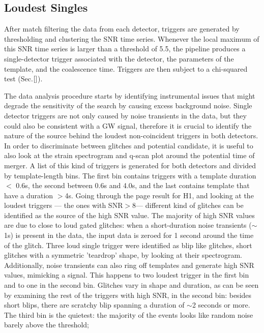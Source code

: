 \documentclass[binding=0.6cm, LaM]{sapthesis}
\begin{document}
\subsection{Loudest Singles}
	After match filtering the data from each detector,
	triggers are generated by thresholding and clustering the SNR time series. 
        Whenever the local maximum of this SNR time series is larger than a threshold of 5.5,
        the pipeline produces a single-detector trigger associated with the detector,
        the parameters of the template, and the coalescence time.
	Triggers are then subject to a chi-squared test (Sec.$\ref{}$).

	The  data analysis procedure starts by identifying instrumental issues 
	that might degrade the sensitivity of the search by causing excess background noise.
	Single detector triggers are not only caused by noise transients in the data,
	but they could also be consistent with a GW signal, 
	therefore it is crucial to identify the nature of  the source behind the loudest non-coincident triggers in both detectors.
	In order to discriminate between glitches and potential candidate, 
	it is useful to also look at the strain spectrogram and q-scan plot around the potential time of merger.
	A list of this kind of triggers is generated for both detectors and divided by template-length bins.
	The first bin contains triggers with a template duration $<$ 0.6s, 
	the second between 0.6s and 4.0s, and the last contains template that have a  duration $>$4s.
	Going through the page result for H1, and looking at the loudest triggers — the ones with SNR$>$8—
	different kind of glitches can be identified as the source of the high SNR value.
	The majority of high SNR values are due to close to loud gated glitches: 
	when a short-duration noise transients ($\sim$1s) is present in the data,
	the input data is zeroed for 1 second around the time of the glitch.
	Three loud single trigger were identified as blip like glitches, 
	short glitches with a symmetric 'teardrop' shape, by looking at their spectrogram.
	Additionally, noise transients can also ring off templates and generate high SNR values,
	mimicking a signal.
	This happens to two loudest trigger in the first bin and to one in the second bin.
	Glitches vary in shape and duration, as can be seen by examining the rest of the triggers with high SNR,  in the second bin:
	besides short blips, there are scratchy blip spanning a duration of $\sim$2 seconds or more.
	The third bin is the quietest: the majority of the events looks like random noise barely above the threshold; 
\end{document}
